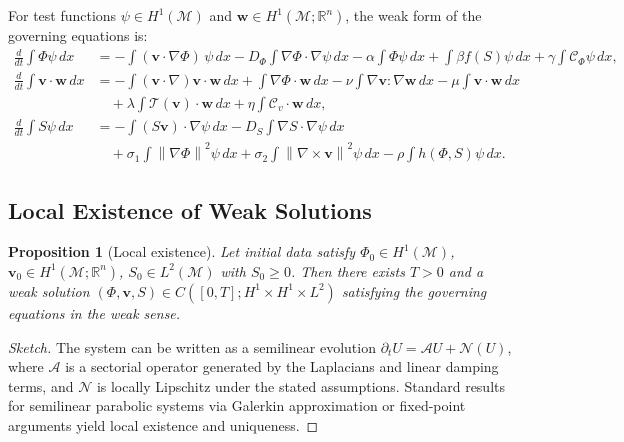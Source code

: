 \documentclass[11pt, a4paper]{article}
\theoremstyle{plain}
\newtheorem{proposition}[theorem]{Proposition}
\theoremstyle{definition}
\newcommand{\Phifield}{\Phi}
\newcommand{\vfield}{\mathbf{v}}
\newcommand{\Sfield}{S}
\newcommand{\statespace}{\mathcal{M}}
\newcommand{\norm}[1]{\left\lVert #1 \right\rVert}
\begin{document}
For test functions $\psi \in H^1(\statespace)$ and
$\mathbf{w} \in H^1(\statespace; \mathbb{R}^n)$, the weak form of the
governing equations is:
\begin{align*}
  \frac{d}{dt} \int \Phifield \psi \, dx
  &= - \int (\vfield \cdot \nabla \Phifield)\, \psi \, dx
     - D_\Phi \int \nabla \Phifield \cdot \nabla \psi \, dx
     - \alpha \int \Phifield \psi \, dx
     + \int \beta f(\Sfield) \psi \, dx
     + \gamma \int \mathcal{C}_\Phi \psi \, dx, \\[4pt]
  \frac{d}{dt} \int \vfield \cdot \mathbf{w} \, dx
  &= - \int (\vfield \cdot \nabla)\vfield \cdot \mathbf{w} \, dx
     + \int \nabla \Phifield \cdot \mathbf{w} \, dx
     - \nu \int \nabla \vfield : \nabla \mathbf{w} \, dx
     - \mu \int \vfield \cdot \mathbf{w} \, dx \\
  &\quad + \lambda \int \mathcal{T}(\vfield) \cdot \mathbf{w} \, dx
     + \eta \int \mathcal{C}_v \cdot \mathbf{w} \, dx, \\[4pt]
  \frac{d}{dt} \int \Sfield \psi \, dx
  &= - \int (\Sfield \vfield) \cdot \nabla \psi \, dx
     - D_S \int \nabla \Sfield \cdot \nabla \psi \, dx \\[2pt]
  &\quad + \sigma_1 \int \norm{\nabla \Phifield}^2 \psi \, dx
     + \sigma_2 \int \norm{\nabla \times \vfield}^2 \psi \, dx
     - \rho \int h(\Phifield, \Sfield) \psi \, dx.
\end{align*}

\subsection{Local Existence of Weak Solutions}

\begin{proposition}[Local existence]
Let initial data satisfy $\Phifield_0 \in H^1(\statespace)$,
$\vfield_0 \in H^1(\statespace; \mathbb{R}^n)$,
$\Sfield_0 \in L^2(\statespace)$ with $\Sfield_0 \geq 0$.
Then there exists $T > 0$ and a weak solution
$(\Phifield, \vfield, \Sfield) \in C([0,T]; H^1 \times H^1 \times L^2)$
satisfying the governing equations in the weak sense.
\end{proposition}

\begin{proof}[Sketch]
The system can be written as a semilinear evolution
$\partial_t U = \mathcal{A} U + \mathcal{N}(U)$,
where $\mathcal{A}$ is a sectorial operator generated by the Laplacians
and linear damping terms, and $\mathcal{N}$ is locally Lipschitz under the
stated assumptions. Standard results for semilinear parabolic systems via
Galerkin approximation or fixed-point arguments yield local existence and
uniqueness.
\end{proof}
\end{document}
